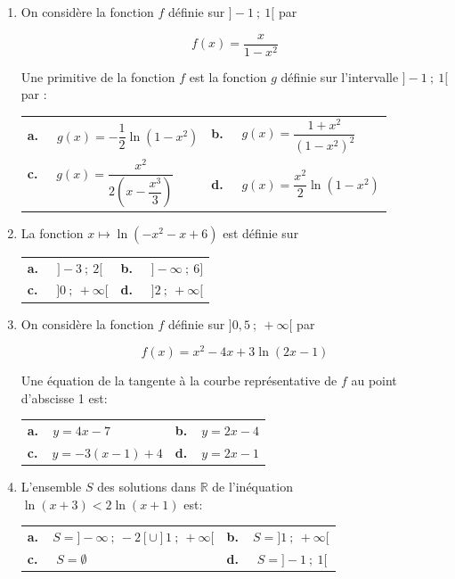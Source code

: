 \documentclass[10pt]{article}
\providecommand{\R}{\mathbb{R}}
\begin{document}
\begin{enumerate}
\item On considère la fonction $f$ définie sur $]- 1~;~1[$ par

\[f(x) = \dfrac{x}{1 - x^2}\]

Une primitive de la fonction $f$ est la fonction $g$ définie sur l'intervalle $] - 1~;~1[$ par :

\begin{center}
\begin{tabularx}{\linewidth}{*{2}{X}}
\textbf{a.~~} $g(x) = - \dfrac12 \ln \left(1 - x^2\right)$&\textbf{b.~~} $g(x) =  \dfrac{1 + x^2}{ \left(1 - x^2\right)^2}$\\
\textbf{c.~~} $g(x)= \dfrac{x^2}{2\left(x - \dfrac{x^3}{3}\right)}$&\textbf{d.~~} $g(x) = \dfrac{x^2}{2}\ln \left(1 - x^2\right)$
\end{tabularx}
\end{center}

\item La  fonction $x \longmapsto  \ln \left(-x^2- x + 6\right)$ est définie sur

\begin{center}
\begin{tabularx}{\linewidth}{*{2}{X}}
\textbf{a.~~} $]- 3~;~2[$&\textbf{b.~~} $]- \infty~;~6]$\\
\textbf{c.~~} $]0~;~+\infty[$&\textbf{d.~~} $]2~;~+\infty[$
\end{tabularx}
\end{center}

\item On considère la fonction $f$ définie sur $]0,5~;~+ \infty [$ par 

\[f(x) =x^2- 4x+ 3 \ln (2x - 1)\]

Une équation de la tangente à la courbe représentative de $f$ au point d'abscisse 1 est:

\begin{center}
\begin{tabularx}{\linewidth}{*{2}{X}}
\textbf{a.~~}$y = 4x- 7$ &\textbf{b.~~}$y = 2x - 4$\\
\textbf{c.~~}$y = -3(x - 1) + 4$ &\textbf{d.~~}$y = 2x - 1$
\end{tabularx}
\end{center}

\item L'ensemble $S$ des solutions dans $\R$ de l'inéquation $\ln (x + 3) < 2\ln (x + 1)$ est:

\begin{center}
\begin{tabularx}{\linewidth}{*{2}{X}}
\textbf{a.~~}$S = ]- \infty~;~-2[ \cup ]1~;~+\infty[$&\textbf{b.~~}$S = ]1~;~+ \infty[$\\
\textbf{c.~~} $S = \emptyset$&\textbf{d.~~} $S = ]- 1~;~1[$
\end{tabularx}
\end{center}

\end{enumerate}

\bigskip
\end{document}
